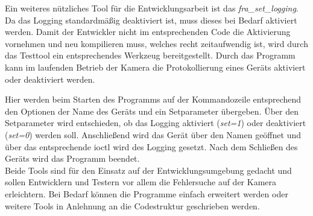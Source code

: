 Ein weiteres nützliches Tool für die Entwicklungsarbeit ist das \textit{fra\_set\_logging}. Da das Logging standardmäßig deaktiviert ist, muss dieses bei Bedarf aktiviert werden. Damit der Entwickler nicht im entsprechenden Code die Aktivierung vornehmen und neu kompilieren muss, welches recht zeitaufwendig ist, wird durch das Testtool ein entsprechendes Werkzeug bereitgestellt. Durch das Programm kann im laufenden Betrieb der Kamera die Protokollierung eines Geräts aktiviert oder deaktiviert werden.


Hier werden beim Starten des Programms auf der Kommandozeile entsprechend den Optionen der Name des Geräts und ein Setparameter übergeben. 
Über den Setparameter wird entschieden, ob das Logging aktiviert (\textit{set=1}) oder deaktiviert (\textit{set=0}) werden soll. Anschließend wird das Gerät über den Namen geöffnet und über das entsprechende \ac{ioctl} wird des Logging gesetzt. Nach dem Schließen des Geräts wird das Programm beendet. \\


Beide Tools sind für den Einsatz auf der Entwicklungsumgebung gedacht und sollen Entwicklern und Testern vor allem die Fehlersuche auf der Kamera erleichtern. Bei Bedarf können die Programme einfach erweitert werden oder weitere Tools in Anlehnung an die Codestruktur geschrieben werden. 